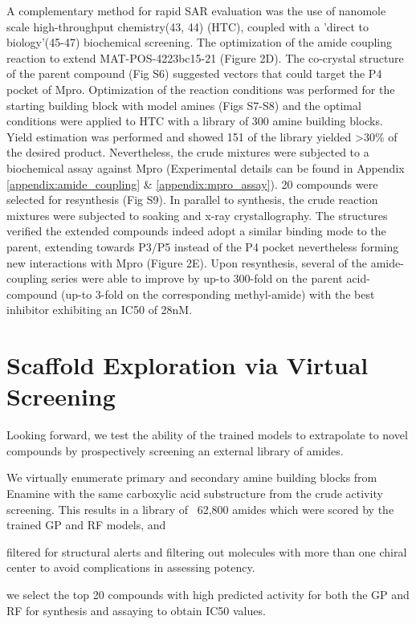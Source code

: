 A complementary method for rapid SAR evaluation was the use of nanomole scale high-throughput chemistry(43, 44) (HTC), coupled with a 'direct to biology'(45-47) biochemical screening. The optimization of the amide coupling reaction to extend MAT-POS-4223bc15-21 (Figure 2D). The co-crystal structure of the parent compound (Fig S6) suggested vectors that could target the P4 pocket of Mpro. Optimization of the reaction conditions was performed for the starting building block with model amines (Figs S7-S8) and the optimal conditions were applied to HTC with a library of 300 amine building blocks. Yield estimation was performed and showed 151 of the library yielded >30\% of the desired product. Nevertheless, the crude mixtures were subjected to a biochemical assay against Mpro (Experimental details can be found in Appendix \ref{appendix:amide_coupling} \& \ref{appendix:mpro_assay}). 20 compounds were selected for resynthesis (Fig S9). In parallel to synthesis, the crude reaction mixtures were subjected to soaking and x-ray crystallography. The structures verified the extended compounds indeed adopt a similar binding mode to the parent, extending towards P3/P5 instead of the P4 pocket nevertheless forming new interactions with Mpro (Figure 2E). Upon resynthesis, several of the amide-coupling series were able to improve by up-to 300-fold on the parent acid-compound (up-to 3-fold on the corresponding methyl-amide) with the best inhibitor exhibiting an IC50 of 28nM.



\section{Scaffold Exploration via Virtual Screening}

Looking forward, we test the ability of the trained models to extrapolate to novel compounds by prospectively screening an external library of amides. 

We virtually enumerate primary and secondary amine building blocks from Enamine with the same carboxylic acid substructure from the crude activity screening. This results in a library of ~62,800 amides which were scored by the trained GP and RF models, and 

filtered for structural alerts and filtering out molecules with more than one chiral center to avoid complications in assessing potency.

we select the top 20 compounds with high predicted activity for both the GP and RF for synthesis and assaying to obtain IC50 values. 

